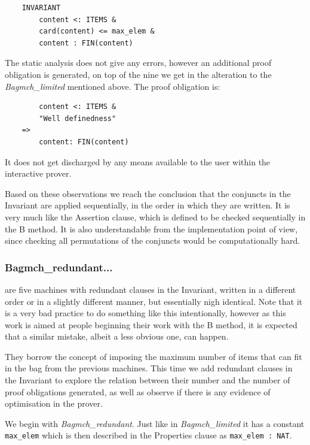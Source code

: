 \documentclass[11pt,journal]{IEEEtran}
\begin{document}
	\begin{lstlisting}
	INVARIANT
		content <: ITEMS &
		card(content) <= max_elem & 
		content : FIN(content)
	\end{lstlisting}
	
	The static analysis does not give any errors, however an additional proof obligation is generated, on top of the nine we get in the alteration to the \emph{Bagmch\_limited} mentioned above. The proof obligation is:
	
	\begin{lstlisting}
    	content <: ITEMS &
		"Well definedness" 
	=>
		content: FIN(content) 
	\end{lstlisting}
	
	It does not get discharged by any means available to the user within the interactive prover.	
	
	Based on these observations we reach the conclusion that the conjuncts in the Invariant are applied sequentially, in the order in which they are written. It is very much like the Assertion clause, which is defined to be checked sequentially in the B method. It is also understandable from the implementation point of view, since checking all permutations of the conjuncts would be computationally hard.
	
	\subsubsection{Bagmch\_redundant...} are five machines with redundant clauses in the Invariant, written in a different order or in a slightly different manner, but essentially nigh identical. Note that it is a very bad practice to do something like this intentionally, however as this work is aimed at people beginning their work with the B method, it is expected that a similar mistake, albeit a less obvious one, can happen.
	
	They borrow the concept of imposing the maximum number of items that can fit in the bag from the previous machines. This time we add redundant clauses in the Invariant to explore the relation between their number and the number of proof obligations generated, as well as observe if there is any evidence of optimisation in the prover.
	
	We begin with \emph{Bagmch\_redundant}. Just like in \emph{Bagmch\_limited} it has a constant \texttt{max\_elem} which is then described in the Properties clause as \texttt{max\_elem : NAT}.
	
\end{document}
